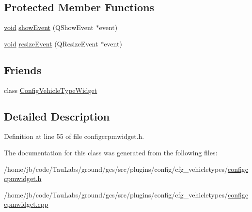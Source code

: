 \subsection*{\-Protected \-Member \-Functions}
\begin{DoxyCompactItemize}
\item 
\hyperlink{group___u_a_v_objects_plugin_ga444cf2ff3f0ecbe028adce838d373f5c}{void} \hyperlink{group___config_plugin_ga400903af96a9e0b31101d06356f267fe}{show\-Event} (\-Q\-Show\-Event $\ast$event)
\item 
\hyperlink{group___u_a_v_objects_plugin_ga444cf2ff3f0ecbe028adce838d373f5c}{void} \hyperlink{group___config_plugin_gaa76c187cd732f13b15ee909af137487f}{resize\-Event} (\-Q\-Resize\-Event $\ast$event)
\end{DoxyCompactItemize}
\subsection*{\-Friends}
\begin{DoxyCompactItemize}
\item 
class \hyperlink{group___config_plugin_gaf1f904d5df6619518f3228b2d5d238d0}{\-Config\-Vehicle\-Type\-Widget}
\end{DoxyCompactItemize}


\subsection{\-Detailed \-Description}


\-Definition at line 55 of file configccpmwidget.\-h.



\-The documentation for this class was generated from the following files\-:\begin{DoxyCompactItemize}
\item 
/home/jb/code/\-Tau\-Labs/ground/gcs/src/plugins/config/cfg\-\_\-vehicletypes/\hyperlink{configccpmwidget_8h}{configccpmwidget.\-h}\item 
/home/jb/code/\-Tau\-Labs/ground/gcs/src/plugins/config/cfg\-\_\-vehicletypes/\hyperlink{configccpmwidget_8cpp}{configccpmwidget.\-cpp}\end{DoxyCompactItemize}
